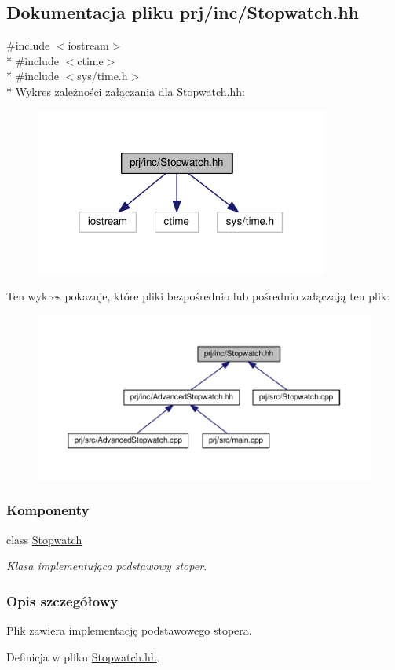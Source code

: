 \hypertarget{_stopwatch_8hh}{\subsection{Dokumentacja pliku prj/inc/\-Stopwatch.hh}
\label{_stopwatch_8hh}
}
{\ttfamily \#include $<$iostream$>$}\\*
{\ttfamily \#include $<$ctime$>$}\\*
{\ttfamily \#include $<$sys/time.\-h$>$}\\*
Wykres zależności załączania dla Stopwatch.\-hh\-:
\nopagebreak
\begin{figure}[H]
\begin{center}
\leavevmode
\includegraphics[width=274pt]{_stopwatch_8hh__incl}
\end{center}
\end{figure}
Ten wykres pokazuje, które pliki bezpośrednio lub pośrednio załączają ten plik\-:
\nopagebreak
\begin{figure}[H]
\begin{center}
\leavevmode
\includegraphics[width=350pt]{_stopwatch_8hh__dep__incl}
\end{center}
\end{figure}
\subsubsection*{Komponenty}
\begin{DoxyCompactItemize}
\item 
class \hyperlink{class_stopwatch}{Stopwatch}
\begin{DoxyCompactList}\small\item\em Klasa implementująca podstawowy stoper. \end{DoxyCompactList}\end{DoxyCompactItemize}


\subsubsection{Opis szczegółowy}
Plik zawiera implementację podstawowego stopera. 

Definicja w pliku \hyperlink{_stopwatch_8hh_source}{Stopwatch.\-hh}.

